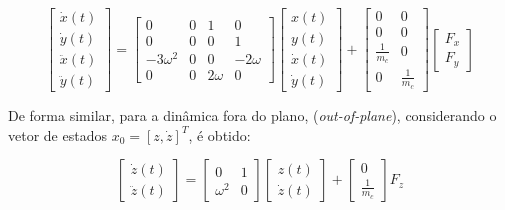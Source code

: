 \begin{equation}
    \label{eq:inplaneXY_NASA}
\begin{bmatrix}
\dot{x}(t) \\
\dot{y}(t) \\
\ddot{x}(t) \\
\ddot{y}(t)
\end{bmatrix}
=
\begin{bmatrix}
0 & 0 & 1 & 0 \\
0 & 0 & 0 & 1 \\
-3\omega^2 & 0 & 0 & -2\omega \\
0 & 0 & 2\omega & 0
\end{bmatrix}
\begin{bmatrix}
x(t) \\
y(t) \\
\dot{x}(t) \\
\dot{y}(t)
\end{bmatrix}
+
\begin{bmatrix}
0 & 0 \\
0 & 0 \\
\frac{1}{m_c} & 0 \\
0 & \frac{1}{m_c}
\end{bmatrix}
\begin{bmatrix}
F_x \\
F_y
\end{bmatrix}
\end{equation}

De forma similar, para a dinâmica fora do plano, (\textit{out-of-plane}), considerando o vetor de estados $x_0 = [z, \dot{z}]^T$, é obtido:


\begin{equation}
    \label{eq:outofplaneZ_NASA}
\begin{bmatrix}
\dot{z}(t) \\
\ddot{z}(t)
\end{bmatrix}
=
\begin{bmatrix}
0 & 1 \\
\omega^2 & 0
\end{bmatrix}
\begin{bmatrix}
z(t) \\
\dot{z}(t)
\end{bmatrix}
+
\begin{bmatrix}
0 \\
\frac{1}{m_c}
\end{bmatrix}
F_z
\end{equation}



